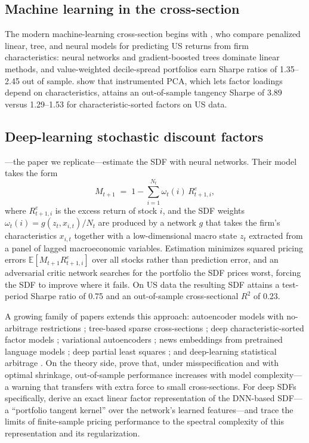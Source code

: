 \documentclass[12pt]{article}
\begin{document}
\subsection{Machine learning in the cross-section}

The modern machine-learning cross-section begins with \citet{gkx2020}, who compare penalized linear, tree, and neural models for predicting US returns from firm characteristics: neural networks and gradient-boosted trees dominate linear methods, and value-weighted decile-spread portfolios earn Sharpe ratios of 1.35--2.45 out of sample. \citet{kps2019} show that instrumented PCA, which lets factor loadings depend on characteristics, attains an out-of-sample tangency Sharpe of 3.89 versus 1.29--1.53 for characteristic-sorted factors on US data.

\subsection{Deep-learning stochastic discount factors}

\citet{cpz2024}---the paper we replicate---estimate the SDF with neural networks. Their model takes the form
\begin{equation}
M_{t+1} \;=\; 1 - \sum_{i=1}^{N_t} \omega_t(i)\, R^e_{t+1,i},
\label{eq:sdf}
\end{equation}
where $R^e_{t+1,i}$ is the excess return of stock $i$, and the SDF weights $\omega_t(i) = g(z_t, x_{i,t})/N_t$ are produced by a network $g$ that takes the firm's characteristics $x_{i,t}$ together with a low-dimensional macro state $z_t$ extracted from a panel of lagged macroeconomic variables. Estimation minimizes squared pricing errors $\mathbb{E}[M_{t+1}R^e_{t+1,i}]$ over all stocks rather than prediction error, and an adversarial critic network searches for the portfolio the SDF prices worst, forcing the SDF to improve where it fails. On US data the resulting SDF attains a test-period Sharpe ratio of 0.75 and an out-of-sample cross-sectional $R^2$ of 0.23.

A growing family of papers extends this approach: autoencoder models with no-arbitrage restrictions \citep{gkx2021}; tree-based sparse cross-sections \citep{bpz2025}; deep characteristic-sorted factor models \citep{fhpx2024}; variational autoencoders \citep{cwh2026}; news embeddings from pretrained language models \citep{wcw2025}; deep partial least squares \citep{dixon2022}; and deep-learning statistical arbitrage \citep{gpz2025}. On the theory side, \citet{kmz2024} prove that, under misspecification and with optimal shrinkage, out-of-sample performance increases with model complexity---a warning that transfers with extra force to small cross-sections. For deep SDFs specifically, \citet{kellykuznetsov2026} derive an exact linear factor representation of the DNN-based SDF---a ``portfolio tangent kernel'' over the network's learned features---and trace the limits of finite-sample pricing performance to the spectral complexity of this representation and its regularization.
\end{document}
